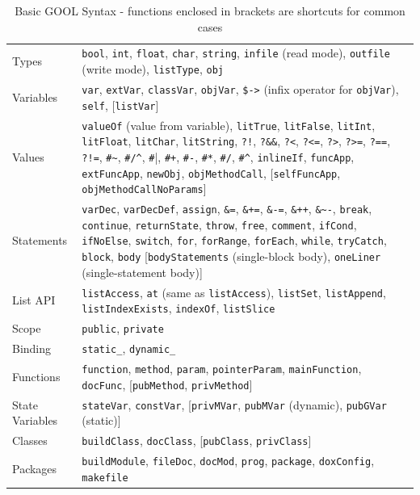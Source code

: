 \documentclass[sigplan,review,prologue,dvipsnames]{acmart}
\begin{document}
\begin{table}[t]
	\caption{Basic GOOL Syntax - functions enclosed in brackets are shortcuts 
	for 
		common cases}
	\begin{tabular}{p{2.2cm}| p{15cm}}
		Types & \verb|bool|, \verb|int|, \verb|float|, \verb|char|, 
		\verb|string|, 
		\verb|infile| (read mode), \verb|outfile| (write mode), 
		\verb|listType|, 
		\verb|obj| \\
		Variables & \verb|var|, \verb|extVar|, \verb|classVar|, \verb|objVar|, 
		\verb|$->| (infix operator for \verb|objVar|), \verb|self|,
		[\verb|listVar|] \\
		Values & \verb|valueOf| (value from variable), \verb|litTrue|, 
		\verb|litFalse|, \verb|litInt|, 
		\verb|litFloat|, \verb|litChar|, \verb|litString|, \verb|?!|, 
		\verb|?&&|, 
		\verb|?<|, \verb|?<=|, \verb|?>|, \verb|?>=|, \verb|?==|, \verb|?!=|, 
		\verb|#~|, \verb|#/^|, \verb|#||, \verb|#+|, \verb|#-|, \verb|#*|, 
		\verb|#/|, \verb|#^|, \verb|inlineIf|, \verb|funcApp|, 
		\verb|extFuncApp|, 
		\verb|newObj|, \verb|objMethodCall|, [\verb|selfFuncApp|, 
		\verb|objMethodCallNoParams|] \\
		Statements & \verb|varDec|, \verb|varDecDef|, \verb|assign|, \verb|&=|, 
		\verb|&+=|, \verb|&-=|, \verb|&++|, \verb|&~-|, \verb|break|, 
		\verb|continue|, \verb|returnState|, \verb|throw|, \verb|free|, 
		\verb|comment|, \verb|ifCond|, \verb|ifNoElse|, \verb|switch|, 
		\verb|for|, 
		\verb|forRange|, \verb|forEach|, \verb|while|, \verb|tryCatch|, 
		\verb|block|, \verb|body| [\verb|bodyStatements| (single-block body), 
		\verb|oneLiner| (single-statement body)] \\
		List API & \verb|listAccess|, \verb|at| (same as \verb|listAccess|), 
		\verb|listSet|, \verb|listAppend|, \verb|listIndexExists|, 
		\verb|indexOf|, \verb|listSlice| \\
		Scope & \verb|public|, \verb|private| \\
		Binding & \verb|static_|, \verb|dynamic_| \\
		Functions & \verb|function|, \verb|method|, \verb|param|, 
		\verb|pointerParam|, \verb|mainFunction|, \verb|docFunc|, 
		[\verb|pubMethod|, \verb|privMethod|] \\
		State Variables & \verb|stateVar|, \verb|constVar|, [\verb|privMVar|, 
		\verb|pubMVar| (dynamic), \verb|pubGVar| (static)]\\
		Classes & \verb|buildClass|, \verb|docClass|, [\verb|pubClass|, 
		\verb|privClass|]\\
		Packages & \verb|buildModule|, \verb|fileDoc|, \verb|docMod|, 
		\verb|prog|, 
		\verb|package|, \verb|doxConfig|, \verb|makefile|
	\end{tabular}
	\label{tab:syntax}
\end{table}
\end{document}
